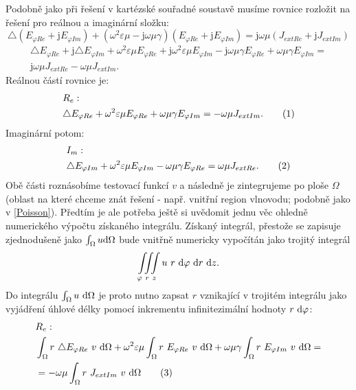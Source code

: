 \documentclass[12pt,a4paper,oneside]{article}
\numberwithin{equation}{section} %
\numberwithin{figure}{section} %
\numberwithin{table}{section} %
\newcommand{\mj}{\mathrm{j}} %
\newcommand\numberthis{\addtocounter{equation}{1}\tag{\theequation}}
\begin{document}
Podobně jako při řešení v kartézské souřadné soustavě musíme rovnice rozložit na řešení pro reálnou a imaginární složku:
\begin{equation}
\triangle (E _{\varphi Re} + \mj E _{\varphi Im}) + (\omega ^2 \varepsilon \mu - \mj \omega \mu \gamma) (E _{\varphi Re} + \mj E _{\varphi Im}) = \mj \omega \mu (J _{extRe} + \mj J _{extIm})
\end{equation}
\begin{equation}
\begin{split}
\triangle E _{\varphi Re} + \mj \triangle E _{\varphi Im} + \omega ^2 \varepsilon \mu E_ {\varphi Re} + \mj \omega ^2 \varepsilon \mu E _{\varphi Im} - \mj \omega \mu \gamma E _{\varphi Re} + \omega \mu \gamma E _{\varphi Im} =\\
\mj \omega \mu J _{extRe} - \omega \mu J _{extIm} .
\end{split}
\end{equation}
Reálnou částí rovnice je:
\begin{align*}
&R_{e}:
\\
&\triangle E_ {\varphi Re} + \omega ^2 \varepsilon \mu E_ {\varphi Re} + \omega \mu \gamma E _{\varphi Im} = - \omega \mu J _{extIm} .
\numberthis
\end{align*}
Imaginární potom:
\begin{align*}
&I_{m}:
\\
&\triangle E _{\varphi Im} + \omega ^2 \varepsilon \mu E _{\varphi Im} - \omega \mu \gamma E _{\varphi Re} = \omega \mu J _{extRe} .
\numberthis
\end{align*}
Obě části roznásobíme testovací funkcí $v$ a následně je  zintegrujeme po ploše $\Omega$ (oblast na které chceme znát řešení - např. vnitřní region vlnovodu; podobně jako v \ref{Poisson}). Předtím je ale potřeba ještě si uvědomit jednu věc ohledně numerického výpočtu získaného integrálu. Získaný integrál, přestože se zapisuje zjednodušeně jako $\int _{\Omega} u \mathrm{d} \Omega$ bude vnitřně numericky vypočítán jako trojitý integrál 
\begin{equation}
\iiint \limits_{\varphi ~ r ~ z} u ~ r ~ \mathrm{d} \varphi ~ \mathrm{d} r ~ \mathrm{d} z . 
\end{equation}
Do integrálu $\int _{\Omega} u ~ \mathrm{d} \Omega$ je proto nutno zapsat $r$ vznikající v trojitém integrálu jako vyjádření úhlové délky pomocí inkrementu infinitezimální hodnoty $r ~ \mathrm{d} \varphi$: 
\begin{align*}
&R_e:
\\
&\int _{\Omega} r ~ \triangle E _{\varphi Re} ~ v ~ \ud \Omega + \omega ^2 \varepsilon \mu \int _{\Omega} r ~ E _{\varphi Re} ~ v ~ \ud \Omega +  \omega \mu \gamma \int _{\Omega} r ~ E _{\varphi Im} ~ v ~ \ud \Omega =\\
&= - \omega \mu \int _{\Omega} r ~ J _{extIm} ~ v ~ \ud \Omega
\numberthis
\end{align*}
\end{document}
